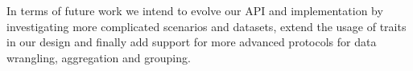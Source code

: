 \documentclass[sigplan]{acmart}
\begin{document}
In terms of future work we intend to evolve our API and implementation by investigating more complicated scenarios and datasets, extend the usage of traits in our design and finally add support for more advanced protocols for data wrangling, aggregation and grouping.
%





%


% 
% 

% 




%
\end{document}
